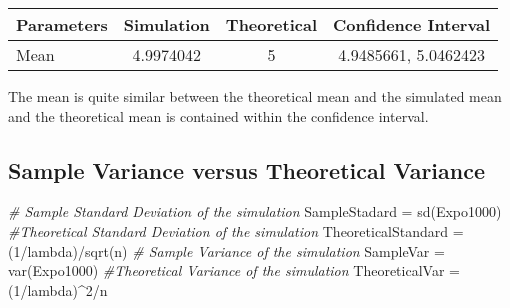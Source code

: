 \documentclass[
]{article}
\newenvironment{Shaded}{\begin{snugshade}}{\end{snugshade}}
\newcommand{\CommentTok}[1]{\textcolor[rgb]{0.56,0.35,0.01}{\textit{#1}}}
\newcommand{\DecValTok}[1]{\textcolor[rgb]{0.00,0.00,0.81}{#1}}
\newcommand{\FunctionTok}[1]{\textcolor[rgb]{0.00,0.00,0.00}{#1}}
\newcommand{\NormalTok}[1]{#1}
\newcommand{\OtherTok}[1]{\textcolor[rgb]{0.56,0.35,0.01}{#1}}
\newcommand{\SpecialCharTok}[1]{\textcolor[rgb]{0.00,0.00,0.00}{#1}}
\begin{document}
\begin{Shaded}
\end{Shaded}

\begin{longtable}[]{@{}lccc@{}}
\toprule
Parameters & Simulation & Theoretical & Confidence Interval \\
\midrule
\endhead
Mean & 4.9974042 & 5 & 4.9485661, 5.0462423 \\
\bottomrule
\end{longtable}

The mean is quite similar between the theoretical mean and the simulated
mean and the theoretical mean is contained within the confidence
interval.

\hypertarget{sample-variance-versus-theoretical-variance}{%
\subsection{Sample Variance versus Theoretical
Variance}\label{sample-variance-versus-theoretical-variance}}

\begin{Shaded}
\begin{Highlighting}[]
\CommentTok{\# Sample Standard Deviation of the simulation}
\NormalTok{SampleStadard }\OtherTok{=} \FunctionTok{sd}\NormalTok{(Expo1000)}
\CommentTok{\#Theoretical Standard Deviation of the simulation}
\NormalTok{TheoreticalStandard }\OtherTok{=}\NormalTok{ (}\DecValTok{1}\SpecialCharTok{/}\NormalTok{lambda)}\SpecialCharTok{/}\FunctionTok{sqrt}\NormalTok{(n)}
\CommentTok{\# Sample Variance of the simulation}
\NormalTok{SampleVar }\OtherTok{=} \FunctionTok{var}\NormalTok{(Expo1000)}
\CommentTok{\#Theoretical Variance of the simulation}
\NormalTok{TheoreticalVar }\OtherTok{=}\NormalTok{ (}\DecValTok{1}\SpecialCharTok{/}\NormalTok{lambda)}\SpecialCharTok{\^{}}\DecValTok{2}\SpecialCharTok{/}\NormalTok{n}
\end{Highlighting}
\end{Shaded}
\end{document}
